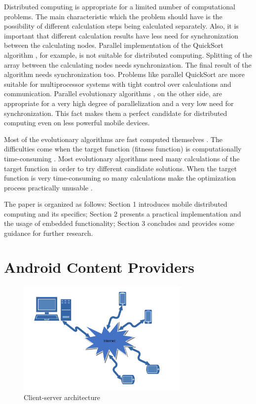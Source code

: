 \documentclass{ifacconf}
\begin{document}
Distributed computing is appropriate for a limited number of computational problems. The main characteristic which the problem should have is the possibility of different calculation steps being calculated separately. Also, it is important that different calculation results have less need for synchronization between the calculating nodes. Parallel implementation of the QuickSort algorithm \cite{Sanders-1997-a}, for example, is not suitable for distributed computing. Splitting of the array between the calculating nodes needs synchronization. The final result of the algorithm needs synchronization too. Problems like parallel QuickSort are more suitable for multiprocessor systems with tight control over calculations and communication. Parallel evolutionary algorithms \cite{Sudholt-2015-a}, on the other side, are appropriate for a very high degree of parallelization and a very low need for synchronization. This fact makes them a perfect candidate for distributed computing even on less powerful mobile devices. 

Most of the evolutionary algorithms are fast computed themselves \cite{Vural-2012-a}. The difficulties come when the target function (fitness function) is computationally time-consuming \cite{Di-Pietro-2004-a}. Most evolutionary algorithms need many calculations of the target function in order to try different candidate solutions. When the target function is very time-consuming so many calculations make the optimization process practically unusable \cite{Lee-2015-a}. 

The paper is organized as follows: Section 1 introduces mobile distributed computing and its specifics; Section 2 presents a practical implementation and the usage of embedded functionality; Section 3 concludes and provides some guidance for further research. 

\section{Android Content Providers}

\begin{figure}
\begin{center}
\includegraphics[width=8.4cm]{images/fig0001}
\caption{Client-server architecture} 
\label{fig0001}
\end{center}
\end{figure}
\end{document}
